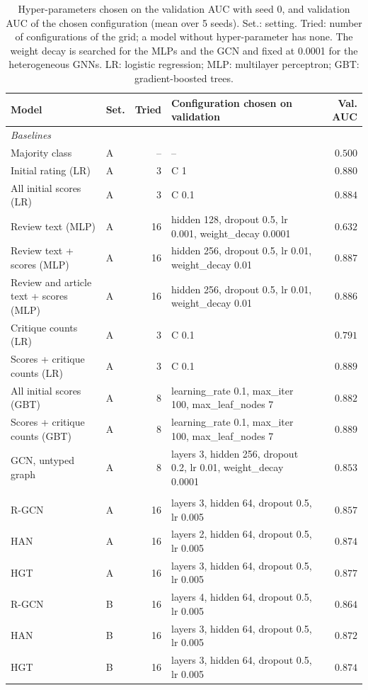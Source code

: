 \begin{table}[t]
\centering
\footnotesize
\setlength{\tabcolsep}{3pt}
\caption{Hyper-parameters chosen on the validation AUC with seed 0, and validation AUC of the chosen configuration (mean over 5 seeds). Set.: setting. Tried: number of configurations of the grid; a model without hyper-parameter has none. The weight decay is searched for the MLPs and the GCN and fixed at 0.0001 for the heterogeneous GNNs. LR: logistic regression; MLP: multilayer perceptron; GBT: gradient-boosted trees.}
\label{tab:hyperparameters}
\begin{tabular}{@{}llrlr@{}}
\toprule
Model & Set. & Tried & Configuration chosen on validation & Val. AUC \\
\midrule
\multicolumn{5}{l}{\emph{Baselines}} \\
Majority class & A & -- & -- & $0.500$ \\
Initial rating (LR) & A & 3 & C 1 & $0.880$ \\
All initial scores (LR) & A & 3 & C 0.1 & $0.884$ \\
Review text (MLP) & A & 16 & hidden 128, dropout 0.5, lr 0.001, weight\_decay 0.0001 & $0.632$ \\
Review text + scores (MLP) & A & 16 & hidden 256, dropout 0.5, lr 0.01, weight\_decay 0.01 & $0.887$ \\
Review and article text + scores (MLP) & A & 16 & hidden 256, dropout 0.5, lr 0.01, weight\_decay 0.01 & $0.886$ \\
Critique counts (LR) & A & 3 & C 0.1 & $0.791$ \\
Scores + critique counts (LR) & A & 3 & C 0.1 & $0.889$ \\
All initial scores (GBT) & A & 8 & learning\_rate 0.1, max\_iter 100, max\_leaf\_nodes 7 & $0.882$ \\
Scores + critique counts (GBT) & A & 8 & learning\_rate 0.1, max\_iter 100, max\_leaf\_nodes 7 & $0.889$ \\
GCN, untyped graph & A & 8 & layers 3, hidden 256, dropout 0.2, lr 0.01, weight\_decay 0.0001 & $0.853$ \\
\addlinespace
\multicolumn{5}{l}{\emph{Heterogeneous GNNs (the variant with score statistics reuses the configuration of the plain model)}} \\
R-GCN & A & 16 & layers 3, hidden 64, dropout 0.5, lr 0.005 & $0.857$ \\
HAN & A & 16 & layers 2, hidden 64, dropout 0.5, lr 0.005 & $0.874$ \\
HGT & A & 16 & layers 3, hidden 64, dropout 0.5, lr 0.005 & $0.877$ \\
R-GCN & B & 16 & layers 4, hidden 64, dropout 0.5, lr 0.005 & $0.864$ \\
HAN & B & 16 & layers 3, hidden 64, dropout 0.5, lr 0.005 & $0.872$ \\
HGT & B & 16 & layers 3, hidden 64, dropout 0.5, lr 0.005 & $0.874$ \\
\bottomrule
\end{tabular}
\end{table}
